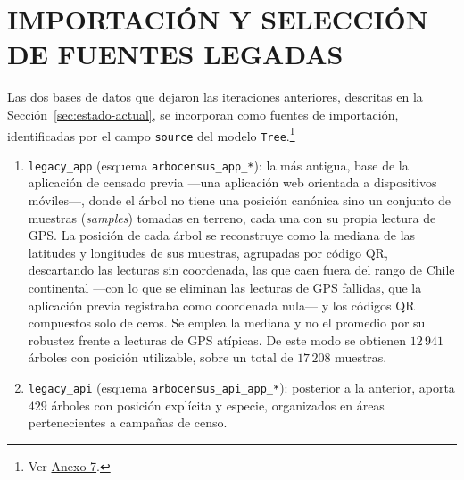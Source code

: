 \section{IMPORTACIÓN Y SELECCIÓN DE FUENTES LEGADAS}
\label{sec:legacy}

Las dos bases de datos que dejaron las iteraciones anteriores, descritas en la
Sección~\ref{sec:estado-actual}, se incorporan como fuentes de importación, identificadas por el
campo \texttt{source} del modelo \texttt{Tree}.\footnote{Ver \hyperref[anx:modelo-legado]{Anexo 7}.}

\begin{enumerate}
  \item \texttt{legacy\_app} (esquema \texttt{arbocensus\_app\_*}): la más antigua, base de la
        aplicación de censado previa ---una aplicación web orientada a dispositivos móviles---,
        donde el árbol no tiene una posición canónica sino un conjunto de muestras
        (\textit{samples}) tomadas en terreno, cada una con su propia lectura de GPS. La posición de
        cada árbol se reconstruye como la mediana de las latitudes y longitudes de sus muestras,
        agrupadas por
        código QR, descartando las lecturas sin coordenada, las que caen fuera del rango de Chile
        continental ---con lo que se eliminan las lecturas de GPS fallidas, que la aplicación previa
        registraba como coordenada nula--- y los códigos QR compuestos solo de ceros. Se emplea la
        mediana y no el promedio por su robustez frente a lecturas de GPS atípicas. De este modo se
        obtienen $12\,941$ árboles con posición utilizable, sobre un total de $17\,208$ muestras.
  \item \texttt{legacy\_api} (esquema \texttt{arbocensus\_api\_app\_*}): posterior a la anterior, 
        aporta $429$ árboles con posición explícita y especie, organizados en áreas pertenecientes a
        campañas de censo.
\end{enumerate}

